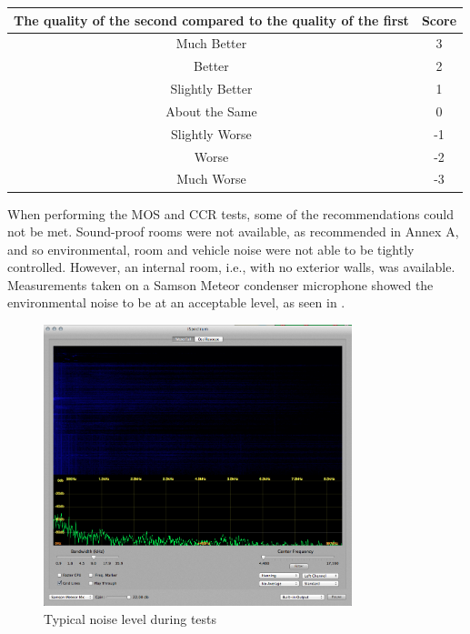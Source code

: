\begin{table}[h]
{\centering{}%
\begin{minipage}[t]{1\columnwidth}%
\begin{center}
\begin{tabular}{|c|c|}
\hline 
The quality of the second compared to the quality of the first & Score\tabularnewline
\hline 
\hline 
Much Better & 3\tabularnewline
\hline 
Better & 2\tabularnewline
\hline 
Slightly Better & 1\tabularnewline
\hline 
About the Same & 0\tabularnewline
\hline 
Slightly Worse & -1\tabularnewline
\hline 
Worse & -2\tabularnewline
\hline 
Much Worse & -3\tabularnewline
\hline 
\end{tabular}
\par\end{center}%
\end{minipage}}
\end{table}


When performing the \ac{MOS} and \ac{CCR} tests, some of the recommendations
could not be met. Sound-proof rooms were not available, as recommended
in \citep{InternationalTelecommunicationUnion1996} Annex A, and so
environmental, room and vehicle noise were not able to be tightly
controlled. However, an internal room, i.e., with no exterior walls,
was available. Measurements taken on a Samson Meteor condenser microphone
showed the environmental noise to be at an acceptable level, as seen
in .

\begin{figure}
\begin{centering}
\includegraphics[width=0.8\textwidth]{fig/environment}
\par\end{centering}

\protect\caption{\label{fig:Typical-noise-level}Typical noise level during tests}
\end{figure}




